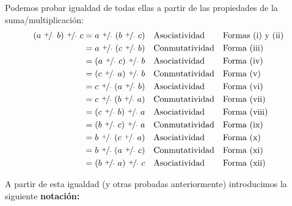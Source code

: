 \documentclass[11pt]{article}
\begin{document}
Podemos probar igualdad de todas ellas a partir de las propiedades de la suma/multiplicación:
\begin{align*}
 (a \ \nicefrac{+}{\cdot} \ b) \ \nicefrac{+}{\cdot} \ c &= a \ \nicefrac{+}{\cdot} \ (b \ \nicefrac{+}{\cdot} \ c) && \text{Asociatividad} && \text{Formas (i) y (ii)}\\
 &= a \ \nicefrac{+}{\cdot} \ (c \ \nicefrac{+}{\cdot} \ b) && \text{Conmutatividad} && \text{Forma (iii)}\\
 &= (a \ \nicefrac{+}{\cdot} \ c) \ \nicefrac{+}{\cdot} \ b && \text{Asociatividad} && \text{Forma (iv)}\\
 &= (c \ \nicefrac{+}{\cdot} \ a) \ \nicefrac{+}{\cdot} \ b && \text{Conmutatividad}&& \text{Forma (v)}\\
 &= c \ \nicefrac{+}{\cdot} \ (a \ \nicefrac{+}{\cdot} \ b) && \text{Asociatividad}&& \text{Forma (vi)}\\
 &= c \ \nicefrac{+}{\cdot} \ (b \ \nicefrac{+}{\cdot} \ a) && \text{Conmutatividad}&& \text{Forma (vii)}\\
 &= (c \ \nicefrac{+}{\cdot} \ b) \ \nicefrac{+}{\cdot} \ a && \text{Asociatividad}&& \text{Forma (viii)}\\
 &= (b \ \nicefrac{+}{\cdot} \ c) \ \nicefrac{+}{\cdot} \ a && \text{Conmutatividad}&& \text{Forma (ix)}\\
 &= b \ \nicefrac{+}{\cdot} \ (c \ \nicefrac{+}{\cdot} \ a) && \text{Asociatividad}&& \text{Forma (x)}\\
 &= b \ \nicefrac{+}{\cdot} \ (a \ \nicefrac{+}{\cdot} \ c) && \text{Conmutatividad}&& \text{Forma (xi)}\\
 &= (b \ \nicefrac{+}{\cdot} \ a) \ \nicefrac{+}{\cdot} \ c && \text{Asociatividad}&& \text{Forma (xii)}
\end{align*}

A partir de esta igualdad (y otras probadas anteriormente) introducimos la siguiente \textbf{notación:}
\end{document}
